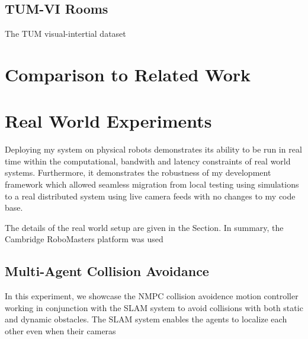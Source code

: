 \subsection{TUM-VI Rooms}
\label{sec:tum-rooms}
The TUM visual-intertial dataset

\section{Comparison to Related Work}
\label{sec:comparison-to-related-work}




\section{Real World Experiments}
\label{sec:real-world-experiments}
Deploying my system on physical robots demonstrates its ability to be run in real time within the computational, bandwith and latency constraints of real world systems. Furthermore, it demonstrates the robustness of my development framework which allowed seamless migration from local testing using simulations to a real distributed system using live camera feeds with no changes to my code base.

The details of the real world setup are given in the  Section. In summary, the Cambridge RoboMasters platform was used

\subsection{Multi-Agent Collision Avoidance}
\label{sec:multi-agent-collision-avoidance}
In this experiment, we showcase the NMPC collision avoidence motion controller working in conjunction with the SLAM system to avoid collisions with both static and dynamic obstacles. The SLAM system enables the agents to localize each other even when their cameras

